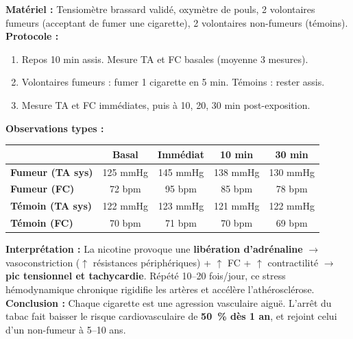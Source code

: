 \documentclass[11pt]{article}
\begin{document}
\begin{experience}
\textbf{Matériel :} Tensiomètre brassard validé, oxymètre de pouls, 2 volontaires fumeurs (acceptant de fumer une cigarette), 2 volontaires non-fumeurs (témoins).
\textbf{Protocole :}
\begin{enumerate}
\item Repos 10 min assis. Mesure TA et FC basales (moyenne 3 mesures).
\item Volontaires fumeurs : fumer 1 cigarette en 5 min. Témoins : rester assis.
\item Mesure TA et FC immédiates, puis à 10, 20, 30 min post-exposition.
\end{enumerate}
\textbf{Observations types :}
\begin{center}
\begin{tabular}{|l|c|c|c|c|}\hline
 & \textbf{Basal} & \textbf{Immédiat} & \textbf{10 min} & \textbf{30 min} \\ \hline
\textbf{Fumeur (TA sys)} & 125 mmHg & 145 mmHg & 138 mmHg & 130 mmHg \\ \hline
\textbf{Fumeur (FC)} & 72 bpm & 95 bpm & 85 bpm & 78 bpm \\ \hline
\textbf{Témoin (TA sys)} & 122 mmHg & 123 mmHg & 121 mmHg & 122 mmHg \\ \hline
\textbf{Témoin (FC)} & 70 bpm & 71 bpm & 70 bpm & 69 bpm \\ \hline
\end{tabular}
\end{center}
\textbf{Interprétation :} La nicotine provoque une \textbf{libération d'adrénaline} $\rightarrow$ vasoconstriction ($\uparrow$ résistances périphériques) + $\uparrow$ FC + $\uparrow$ contractilité $\rightarrow$ \textbf{pic tensionnel et tachycardie}. Répété 10--20 fois/jour, ce stress hémodynamique chronique rigidifie les artères et accélère l'athérosclérose.
\textbf{Conclusion :} Chaque cigarette est une agression vasculaire aiguë. L'arrêt du tabac fait baisser le risque cardiovasculaire de \textbf{50~\% dès 1 an}, et rejoint celui d'un non-fumeur à 5--10 ans.
\end{experience}
\end{document}
